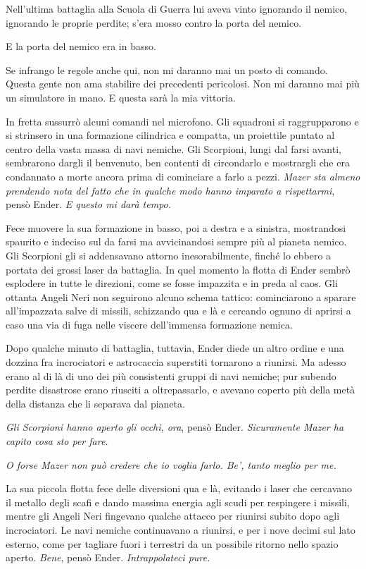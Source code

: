 {Nell'ultima battaglia alla Scuola di Guerra lui aveva vinto ignorando
	il nemico, ignorando le proprie perdite; s'era mosso contro la porta del
	nemico.}

{E la porta del nemico era in basso.}

{Se infrango le regole anche qui, non mi daranno mai un posto di
	comando. Questa gente non ama stabilire dei precedenti pericolosi. Non
	mi daranno mai più un simulatore in mano. E questa sarà la mia
	vittoria.}

{In fretta sussurrò alcuni comandi nel microfono. Gli squadroni si
	raggrupparono e si strinsero in una formazione cilindrica e compatta, un
	proiettile puntato al centro della vasta massa di navi nemiche. Gli
	Scorpioni, lungi dal farsi avanti, sembrarono dargli il benvenuto, ben
	contenti di circondarlo e mostrargli che era condannato a morte ancora
	prima di cominciare a farlo a pezzi. \emph{Mazer sta almeno prendendo
		nota del fatto che in qualche modo hanno imparato a rispettarmi},
	\emph{} pensò Ender. \emph{E questo mi darà tempo.}}

{Fece muovere la sua formazione in basso, poi a destra e a sinistra,
	mostrandosi spaurito e indeciso sul da farsi ma avvicinandosi sempre più
	al pianeta nemico. Gli Scorpioni gli si addensavano attorno
	inesorabilmente, finché lo ebbero a portata dei grossi laser da
	battaglia. In quel momento la flotta di Ender sembrò esplodere in tutte
	le direzioni, come se fosse impazzita e in preda al caos. Gli ottanta
	Angeli Neri non seguirono alcuno schema tattico: cominciarono a sparare
	all'impazzata salve di missili, schizzando qua e là e cercando ognuno di
	aprirsi a caso una via di fuga nelle viscere dell'immensa formazione
	nemica.}

{Dopo qualche minuto di battaglia, tuttavia, Ender diede un altro ordine
	e una dozzina fra incrociatori e astrocaccia superstiti tornarono a
	riunirsi. Ma adesso erano al di là di uno dei più consistenti gruppi di
	navi nemiche; pur subendo perdite disastrose erano riusciti a
	oltrepassarlo, e avevano coperto più della metà della distanza che li
	separava dal pianeta.}

\emph{{Gli Scorpioni hanno aperto gli occhi, ora}}{, \emph{} pensò
	Ender. \emph{Sicuramente Mazer ha capito cosa sto per fare.}}

\emph{{O forse Mazer non può credere che io voglia farlo. Be', tanto
		meglio per me.}}

{La sua piccola flotta fece delle diversioni qua e là, evitando i laser
	che cercavano il metallo degli scafi e dando massima energia agli scudi
	per respingere i missili, mentre gli Angeli Neri fingevano qualche
	attacco per riunirsi subito dopo agli incrociatori. Le navi nemiche
	continuavano a riunirsi, e per i nove decimi sul lato esterno, come per
	tagliare fuori i terrestri da un possibile ritorno nello spazio aperto.
	\emph{Bene}, \emph{} pensò Ender. \emph{Intrappolateci pure.}}

